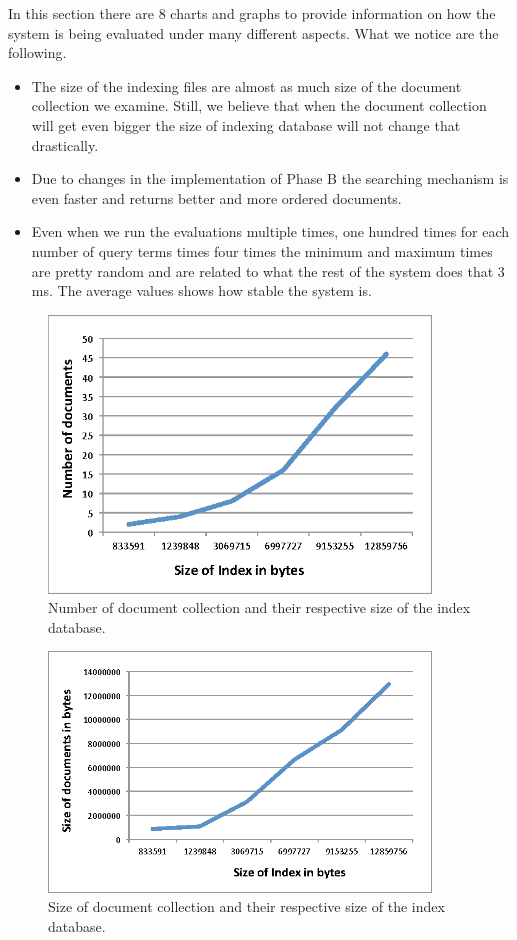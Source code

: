 \documentclass[letterpaper,10pt]{article}
\begin{document}
In this section there are 8 charts and graphs to provide information on how the
system is being evaluated under many different aspects. What we notice are the
following. 

\begin{itemize} 
\item The size of the indexing files are almost as much size of
the document collection we examine. Still, we believe that when the document
collection will get even bigger the size of indexing database will not change
that drastically.
\item Due to changes in the implementation of Phase B the
searching mechanism is even faster and returns better and more ordered
documents.
\item Even when we run the evaluations multiple times, one hundred times
for each number of query terms times four times the minimum and maximum times
are pretty random and are related to what the rest of the system does that 3
ms. The average values shows how stable the system is.  
\end{itemize}

\begin{figure}[H]
    \centering
    \includegraphics[width=4in]{docNumber-indexSize.eps}
    \caption{ Number of document collection and their respective size of the index database. }
    \label{Query structure}
\end{figure}

\begin{figure}[H]
    \centering
    \includegraphics[width=4in]{DocSize-IndexSize.eps}
    \caption{ Size of document collection and their respective size of the index database. }
    \label{Query structure}
\end{figure}
\end{document}
